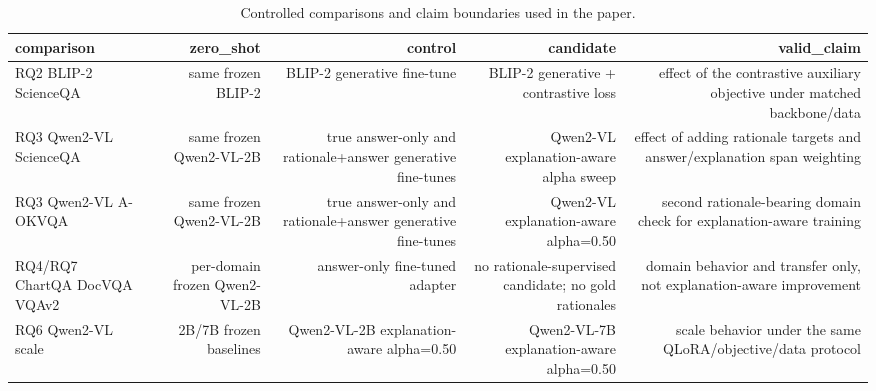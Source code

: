 \begin{table}
\caption{Controlled comparisons and claim boundaries used in the paper.}
\label{tab:comparison_design}
\begin{tabular}{lrrrr}
\toprule
comparison & zero_shot & control & candidate & valid_claim \\
\midrule
RQ2 BLIP-2 ScienceQA & same frozen BLIP-2 & BLIP-2 generative fine-tune & BLIP-2 generative + contrastive loss & effect of the contrastive auxiliary objective under matched backbone/data \\
RQ3 Qwen2-VL ScienceQA & same frozen Qwen2-VL-2B & true answer-only and rationale+answer generative fine-tunes & Qwen2-VL explanation-aware alpha sweep & effect of adding rationale targets and answer/explanation span weighting \\
RQ3 Qwen2-VL A-OKVQA & same frozen Qwen2-VL-2B & true answer-only and rationale+answer generative fine-tunes & Qwen2-VL explanation-aware alpha=0.50 & second rationale-bearing domain check for explanation-aware training \\
RQ4/RQ7 ChartQA DocVQA VQAv2 & per-domain frozen Qwen2-VL-2B & answer-only fine-tuned adapter & no rationale-supervised candidate; no gold rationales & domain behavior and transfer only, not explanation-aware improvement \\
RQ6 Qwen2-VL scale & 2B/7B frozen baselines & Qwen2-VL-2B explanation-aware alpha=0.50 & Qwen2-VL-7B explanation-aware alpha=0.50 & scale behavior under the same QLoRA/objective/data protocol \\
\bottomrule
\end{tabular}
\end{table}
